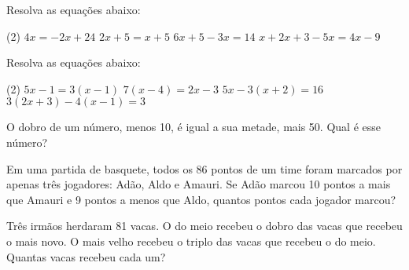 \documentclass[a4paper,11pt,addpoints]{exam}
\begin{document}
\begin{questions}

	\question[1]

	Resolva as equações abaixo:

	\begin{tasks}(2)
		\task $4x = -2x + 24$
		\task $2x + 5 = x + 5$
		\task $6x + 5 - 3x = 14$
		\task $x + 2x + 3 - 5x = 4x - 9$
	\end{tasks}

	\question[1]

	Resolva as equações abaixo:

	\begin{tasks}(2)
		\task $5x - 1 = 3(x - 1)$
		\task $7(x-4) = 2x - 3$
		\task $5x - 3(x + 2) = 16$
		\task $3(2x + 3) - 4(x - 1) = 3$
	\end{tasks}

	\question[1]

	O dobro de um número, menos 10, é igual a sua metade, mais 50. Qual é esse
	número?

	\question[1]

	Em uma partida de basquete, todos os 86 pontos de um time foram marcados por
	apenas três jogadores: Adão, Aldo e Amauri. Se Adão marcou 10 pontos a mais
	que Amauri e 9 pontos a menos que Aldo, quantos pontos cada jogador marcou?

	\question[1]

	Três irmãos herdaram 81 vacas. O do meio recebeu o dobro das vacas que
	recebeu o mais novo. O mais velho recebeu o triplo das vacas que recebeu
	o do meio. Quantas vacas recebeu cada um?


\end{questions}
\end{document}
